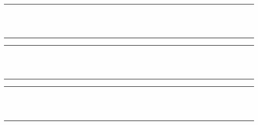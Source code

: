 \documentclass[conference]{IEEEtran}
\begin{document}
\noindent\rule{\columnwidth}{0.4pt}\\
\\
\rule{\columnwidth}{0.4pt}

\vspace{6mm}

\noindent\rule{\columnwidth}{0.4pt}\\
\\
\rule{\columnwidth}{0.4pt}

\vspace{6mm}

\noindent\rule{\columnwidth}{0.4pt}\\
\\
\rule{\columnwidth}{0.4pt}
\end{document}

